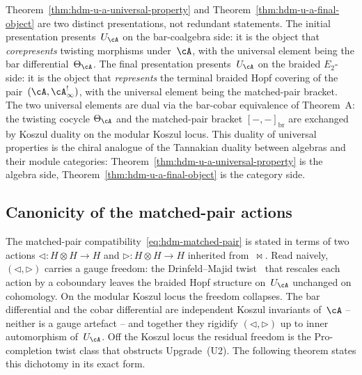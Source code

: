 \begin{remark}
\label{rem:hdm-u-a-final-versus-initial}
Theorem~\ref{thm:hdm-u-a-universal-property} and
Theorem~\ref{thm:hdm-u-a-final-object} are two distinct
presentations, not redundant statements. The initial presentation
presents~$U_\cA$ on the bar-coalgebra side: it is the object
that \emph{corepresents} twisting morphisms under~$\cA$, with the
universal element being the bar differential~$\Theta_\cA$. The final
presentation presents~$U_\cA$ on the braided $E_2$-side: it is the object
that \emph{represents} the terminal braided Hopf covering of the
pair~$(\cA,\cA^!_\infty)$, with the universal element being the
matched-pair bracket. The two universal elements are dual
via the bar-cobar equivalence of Theorem~A: the twisting cocycle
$\Theta_\cA$ and the matched-pair bracket $[-,-]_{\mathrm{br}}$ are
exchanged by Koszul duality on the modular Koszul locus. This
duality of universal properties is the chiral analogue of the
Tannakian duality between algebras and their module categories:
Theorem~\ref{thm:hdm-u-a-universal-property} is the algebra side,
Theorem~\ref{thm:hdm-u-a-final-object} is the category side.
\end{remark}

\subsection{Canonicity of the matched-pair actions}
\label{subsec:hdm-matched-pair-canonicity}

The matched-pair
compatibility~\eqref{eq:hdm-matched-pair} is stated in terms of two
actions
$\triangleleft\colon H\otimes H\to H$ and
$\triangleright\colon H\otimes H\to H$ inherited from~$\bowtie$.
Read naively, $(\triangleleft,\triangleright)$ carries a gauge
freedom: the Drinfeld--Majid twist~\cite{Maj94,Maj95} that rescales
each action by a coboundary leaves the braided Hopf structure
on~$U_\cA$ unchanged on cohomology. On the modular Koszul locus the
freedom collapses. The bar differential and the cobar differential
are independent Koszul invariants of~$\cA$ -- neither is a gauge
artefact -- and together they rigidify
$(\triangleleft,\triangleright)$ up to inner automorphism of~$U_\cA$.
Off the Koszul locus the residual freedom is the $\mathrm{Pro}$-completion
twist class that obstructs Upgrade~(U2). The following theorem states
this dichotomy in its exact form.

